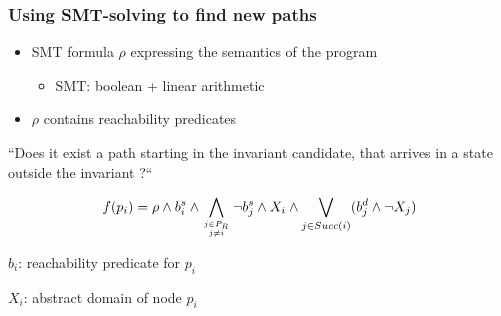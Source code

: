 \documentclass{beamer}
\begin{document}
\begin{frame}
\begin{columns}
\begin{column}{5.5cm}
{
}
\end{column}
\end{columns}
\end{frame}

\begin{frame}
  \frametitle{Using SMT-solving to find new paths}
\begin{itemize}
\item SMT formula $\rho$ expressing the semantics of the program
\begin{itemize}
\item SMT: boolean + linear arithmetic
\end{itemize}
\item $\rho$ contains reachability predicates
\end{itemize}
\bigskip
``Does it exist a path starting in the invariant candidate, that arrives in a
state outside the invariant {?}`` 
\bigskip

$$f(p_i) = \rho \wedge b_i^s \wedge 
\displaystyle\bigwedge_{j \in P_R \atop j \neq i} \neg
b_j^s \wedge X_i \wedge \displaystyle\bigvee_{j \in Succ(i)} (b_j^d \wedge
 \neg X_j)$$


\footnotesize{
$b_{i}$: reachability predicate for $p_i$

$X_{i}$: abstract domain of node $p_i$
}
\end{frame}
\end{document}
